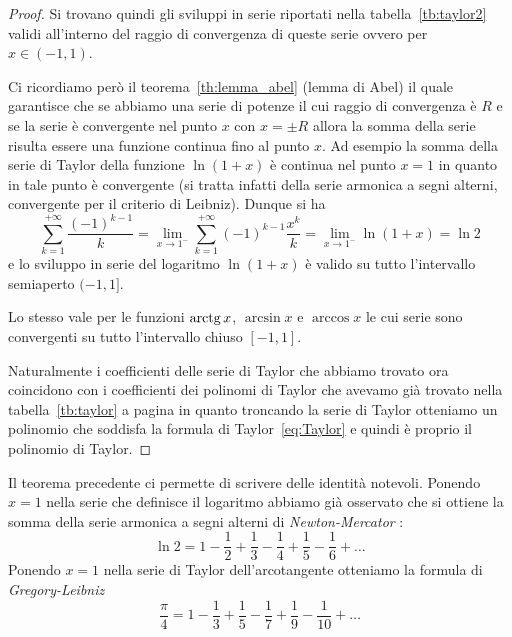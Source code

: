 \begin{proof}
  Si trovano quindi gli sviluppi in serie riportati nella tabella~\ref{tb:taylor2}
  validi all'interno del raggio di convergenza di queste serie ovvero per $x\in (-1,1)$.

  Ci ricordiamo però il teorema~\ref{th:lemma_abel} (lemma di Abel) il quale 
  garantisce che se abbiamo una serie di potenze il cui raggio di convergenza 
  è $R$ e se la serie è convergente nel punto $x$ con $x=\pm R$ allora 
  la somma della serie risulta essere una funzione continua fino al punto $x$.
  Ad esempio la somma della serie di Taylor della funzione $\ln(1+x)$
  è continua nel punto $x=1$ in quanto in tale punto è convergente 
  (si tratta infatti della serie armonica a segni alterni, 
  convergente per il criterio di Leibniz). 
  Dunque si ha 
  \begin{equation}\label{eq:somma_serie_leibniz}
    \sum_{k=1}^{+\infty} \frac{(-1)^{k-1}} k 
    = \lim_{x\to 1^-} \sum_{k=1}^{+\infty} (-1)^{k-1} \frac{x^k}{k}
    = \lim_{x\to 1^-} \ln (1+x) = \ln 2 
  \end{equation}
  e lo sviluppo in serie del logaritmo $\ln(1+x)$ è valido su 
  tutto l'intervallo semiaperto $(-1,1]$. 

  Lo stesso vale per le funzioni $\operatorname{arctg} x$, $\arcsin x$ e $\arccos x$ le cui serie 
  sono convergenti su tutto l'intervallo chiuso $[-1,1]$.

  Naturalmente i coefficienti delle serie di Taylor che abbiamo trovato ora
  coincidono con i coefficienti 
  dei polinomi di Taylor che avevamo già trovato nella tabella~\ref{tb:taylor}
  a pagina \pageref{tb:taylor} in quanto troncando la serie di Taylor otteniamo 
  un polinomio che soddisfa la formula di Taylor~\eqref{eq:Taylor} 
  e quindi è proprio il polinomio di Taylor.
\end{proof}

Il teorema precedente ci permette di scrivere delle identità notevoli. 
Ponendo $x=1$ nella serie che definisce il logaritmo abbiamo già osservato 
che si ottiene la somma della serie armonica a segni alterni di \emph{Newton-Mercator}%
%
:
%
%
%
%
\begin{equation}\label{eq:serie_ln2}
  \ln 2 = 1 - \frac 1 2 + \frac 1 3 - \frac 1 4 + \frac 1 5 - \frac 1 6 + \dots
\end{equation}
Ponendo $x=1$ nella serie di Taylor dell'arcotangente otteniamo 
la formula di \emph{Gregory-Leibniz}%
%
%
%
%
%
\[
  \frac \pi 4 =
   1 - \frac 1 3 + \frac 1 5 - \frac 1 7 + \frac 1 9 - \frac 1 {10} + \dots
\]

